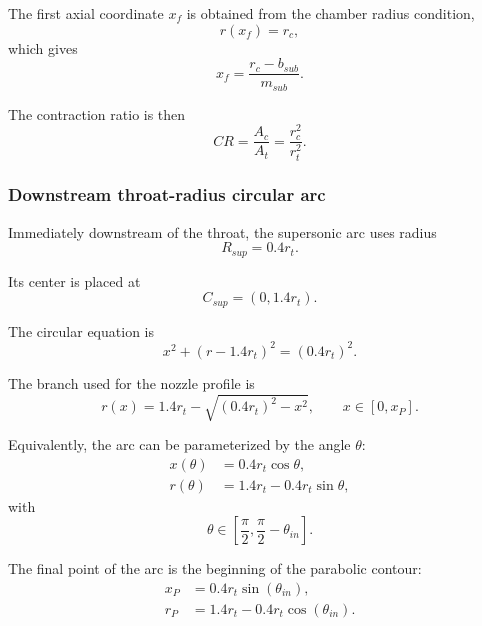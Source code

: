 \documentclass[11pt,a4paper]{article}
\begin{document}
The first axial coordinate $x_f$ is obtained from the chamber radius condition,
\begin{equation}
r(x_f)=r_c,
\end{equation}
which gives
\begin{equation}
x_f=\frac{r_c-b_{sub}}{m_{sub}} .
\label{eq:xf}
\end{equation}

The contraction ratio is then
\begin{equation}
CR=\frac{A_c}{A_t}=\frac{r_c^2}{r_t^2}.
\label{eq:contraction_ratio}
\end{equation}

\subsubsection{Downstream throat-radius circular arc}

Immediately downstream of the throat, the supersonic arc uses radius
\begin{equation}
R_{sup}=0.4r_t.
\end{equation}

Its center is placed at
\begin{equation}
C_{sup}=(0,1.4r_t).
\end{equation}

The circular equation is
\begin{equation}
x^2+(r-1.4r_t)^2=(0.4r_t)^2.
\end{equation}

The branch used for the nozzle profile is
\begin{equation}
r(x)=1.4r_t-\sqrt{(0.4r_t)^2-x^2},
\qquad x\in[0,x_P].
\label{eq:sup_arc}
\end{equation}

Equivalently, the arc can be parameterized by the angle $\theta$:
\begin{align}
x(\theta)&=0.4r_t\cos\theta,\\
r(\theta)&=1.4r_t-0.4r_t\sin\theta,
\end{align}
with
\begin{equation}
\theta\in\left[\frac{\pi}{2},\frac{\pi}{2}-\theta_{in}\right].
\end{equation}

The final point of the arc is the beginning of the parabolic contour:
\begin{align}
x_P &=0.4r_t\sin(\theta_{in}),
\label{eq:xP}\\
r_P &=1.4r_t-0.4r_t\cos(\theta_{in}).
\label{eq:yP}
\end{align}
\end{document}
